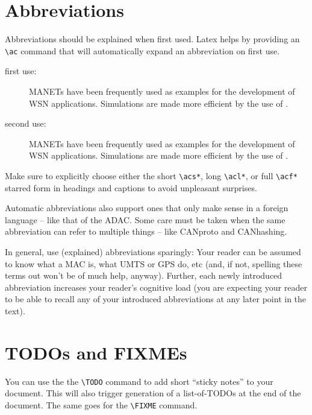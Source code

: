 \documentclass[]{nsm-thesis}
\begin{document}
\section{Abbreviations}

Abbreviations should be explained when first used.
Latex helps by providing an \verb|\ac| command that will automatically expand an abbreviation on first use.

\begin{description}

\item[first use:]
\acp{MANET} have been frequently used as examples for the development of \ac{WSN} applications.
Simulations are made more efficient by the use of .

\item[second use:]
\acp{MANET} have been frequently used as examples for the development of \ac{WSN} applications.
Simulations are made more efficient by the use of .

\end{description}

Make sure to explicitly choose either the short \verb|\acs*|, long \verb|\acl*|, or full \verb|\acf*| starred form in headings and captions to avoid unpleasant surprises.

Automatic abbreviations also support ones that only make sense in a foreign language -- like that of the \ac{ADAC}.
Some care must be taken when the same abbreviation can refer to multiple things -- like \ac{CANproto} and \ac{CANhashing}.

In general, use (explained) abbreviations sparingly:
Your reader can be assumed to know what a MAC is, what UMTS or GPS do, etc (and, if not, spelling these terms out won't be of much help, anyway).
Further, each newly introduced abbreviation increases your reader's cognitive load (you are expecting your reader to be able to recall any of your introduced abbreviations at any later point in the text).


\section{TODOs and FIXMEs}

You can use the the \verb|\TODO| command to add short \enquote{sticky notes} to your document.
This will also trigger generation of a list-of-TODOs at the end of the document.
The same goes for the \verb|\FIXME| command.
\end{document}
